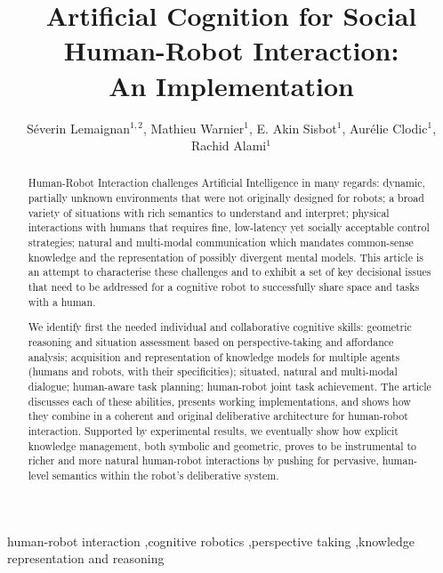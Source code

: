 \documentclass[preprint,3p,times]{elsarticle}
\begin{document}
\begin{frontmatter}

\title{\LARGE \bf
Artificial Cognition for Social Human-Robot Interaction:\\ An
    Implementation
}

\author{Séverin Lemaignan$^{1,2}$, Mathieu Warnier$^1$, E. Akin Sisbot$^1$,
    Aurélie Clodic$^1$, Rachid Alami$^1$}

\address{
$^1$LAAS-CNRS, Univ. de Toulouse, CNRS\\
7 avenue du Colonel Roche, F-31400 Toulouse, France\\
{\tt firstname.surname@laas.fr}
}

\address{
$^2$Centre for Robotics and Neural Systems\\
Plymouth University, Plymouth, United Kingdom\\
{\tt firstname.surname@plymouth.ac.uk}
}



\begin{abstract}

Human-Robot Interaction challenges Artificial Intelligence in many regards:
dynamic, partially unknown environments that were not originally designed for
robots; a broad variety of situations with rich semantics to understand and
interpret; physical interactions with humans that requires fine, low-latency yet
socially acceptable control strategies; natural and multi-modal communication
which mandates common-sense knowledge and the representation of possibly
divergent mental models. This article is an attempt to characterise these challenges
and to exhibit a set of key decisional issues that need to be addressed for a
cognitive robot to successfully share space and tasks with a human.

We identify first the needed individual and collaborative cognitive skills: geometric
reasoning and situation assessment based on perspective-taking and
affordance analysis; acquisition and representation of knowledge models for
multiple agents (humans and robots, with their specificities); situated,
natural and multi-modal dialogue; human-aware task planning; human-robot
joint task achievement. The article discusses each of these abilities,
presents working implementations, and shows how they combine in a coherent
and original deliberative architecture for human-robot interaction.
Supported by experimental results, we eventually show how explicit knowledge
management, both symbolic and geometric, proves to be instrumental to richer
and more natural human-robot interactions by pushing for pervasive,
human-level semantics within the robot's deliberative system.

\end{abstract}

\begin{keyword}
    human-robot interaction \sep cognitive robotics \sep perspective taking \sep knowledge representation and reasoning
\end{keyword}

\end{frontmatter}
\end{document}
